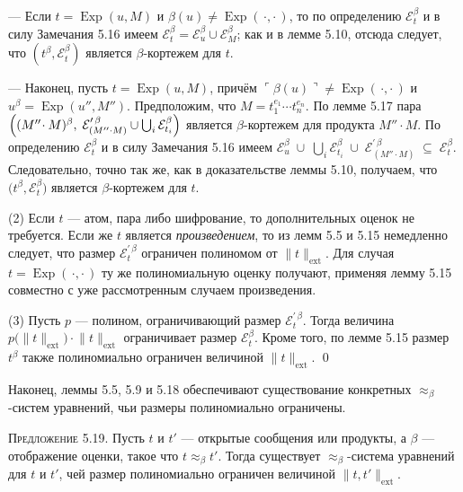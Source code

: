 — Если $t=\operatorname{Exp}(u,M)$ и
  $\beta(u)\neq\operatorname{Exp}(\,\cdot,\cdot\,)$, то по определению
  $\mathcal E_{t}^{\beta}$ и в силу Замечания 5.16 имеем
  $\mathcal E_{t}^{\beta}= \mathcal E_{u}^{\beta}\cup\mathcal E_{M}^{\beta}$;
  как и в лемме 5.10, отсюда следует, что
  $(t^{\beta},\mathcal E_{t}^{\beta})$ является $\beta$-кортежем для $t$.

— Наконец, пусть $t=\operatorname{Exp}(u,M)$, причём
$\ulcorner\beta(u)\urcorner\neq\operatorname{Exp}(\,\cdot,\cdot\,)$ и
$u^{\beta}= \operatorname{Exp}(u'',M'')$.
Предположим, что $M=t_{1}^{e_{1}}\!\cdots t_{n}^{e_{n}}$.
По лемме 5.17 пара
\(
  \Bigl((M''\!\cdot M)^{\beta},\;
        \mathcal E_{(M''\cdot M)}^{\prime\,\beta}\cup
        \bigcup_{i}\mathcal E_{t_{i}}^{\beta}\Bigr)
\)
является $\beta$-кортежем для продукта $M''\!\cdot M$.
По определению $\mathcal E_{t}^{\beta}$ и в силу Замечания 5.16 имеем
\(
  \mathcal E_{u}^{\beta}\;\cup\;
  \bigcup_{i}\mathcal E_{t_{i}}^{\beta}\;\cup\;
  \mathcal E_{(M''\cdot M)}^{\prime\,\beta}
  \;\subseteq\; \mathcal E_{t}^{\beta}.
\)
Следовательно, точно так же, как в доказательстве леммы 5.10,
получаем, что $\bigl(t^{\beta},\mathcal E_{t}^{\beta}\bigr)$
является $\beta$-кортежем для $t$.

\medskip
\noindent(2)\; Если $t$ — атом, пара либо шифрование, то дополнительных
оценок не требуется. Если же $t$ является \emph{произведением}, то из
лемм 5.5 и 5.15 немедленно следует, что размер
$\mathcal E_{t}^{\prime\,\beta}$ ограничен полиномом от
$\lVert t\rVert_{\text{ext}}$.  
Для случая $t=\operatorname{Exp}(\,\cdot,\cdot\,)$ ту же полиномиальную
оценку получают, применяя лемму 5.15 совместно с уже рассмотренным
случаем произведения.

\medskip
\noindent(3)\; Пусть $p$ — полином, ограничивающий размер
$\mathcal E_{t}^{\prime\,\beta}$. Тогда величина
\(p\!\bigl(\lVert t\rVert_{\text{ext}}\bigr)\cdot\lVert t\rVert_{\text{ext}}\)
ограничивает размер $\mathcal E_{t}^{\beta}$.
Кроме того, по лемме 5.15 размер $t^{\beta}$ также
полиномиально ограничен величиной $\lVert t\rVert_{\text{ext}}$.
\qed

Наконец, леммы 5.5, 5.9 и 5.18 обеспечивают существование
конкретных $\approx_{\beta}$-систем уравнений, чьи размеры
полиномиально ограничены.

\textsc{Предложение 5.19.}
Пусть $t$ и $t'$ — открытые сообщения или продукты, а
$\beta$ — отображение оценки, такое что $t \approx_{\beta} t'$.
Тогда существует $\approx_{\beta}$-система уравнений для
$t$ и $t'$, чей размер полиномиально ограничен величиной
$\lVert t,t'\rVert_{\text{ext}}$.

